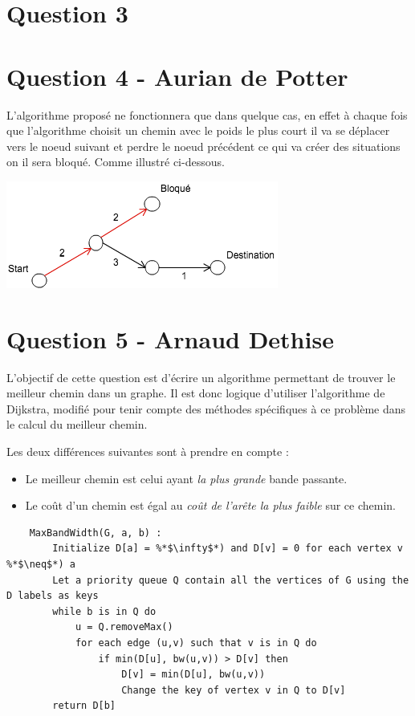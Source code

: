 \documentclass[10pt,a4paper]{article}
\begin{document}
\section*{Question 3}
\section*{Question 4 - Aurian de Potter}
L'algorithme proposé ne fonctionnera que dans quelque cas, en effet à chaque fois que l'algorithme choisit un chemin avec le poids le plus court il va se déplacer vers le noeud suivant et perdre le noeud précédent ce qui va créer des situations on il sera bloqué. Comme illustré ci-dessous.

\begin{center}
    \includegraphics[scale=0.7]{ex.png}
\end{center}

\section*{Question 5 - Arnaud Dethise}

	L'objectif de cette question est d'écrire un algorithme permettant de trouver le meilleur chemin dans un graphe. 
	Il est donc logique d'utiliser l'algorithme de Dijkstra, modifié pour tenir compte des méthodes spécifiques à ce problème dans le calcul du meilleur chemin.
	
	Les deux différences suivantes sont à prendre en compte :
	\begin{itemize}
	\item Le meilleur chemin est celui ayant \textit{la plus grande} bande passante.
	\item Le coût d'un chemin est égal au \textit{coût de l'arête la plus faible} sur ce chemin.
	\end{itemize}
	
	\begin{lstlisting}
	MaxBandWidth(G, a, b) :
		Initialize D[a] = %*$\infty$*) and D[v] = 0 for each vertex v %*$\neq$*) a
		Let a priority queue Q contain all the vertices of G using the D labels as keys
		while b is in Q do
			u = Q.removeMax()
			for each edge (u,v) such that v is in Q do
				if min(D[u], bw(u,v)) > D[v] then
					D[v] = min(D[u], bw(u,v))
					Change the key of vertex v in Q to D[v]
		return D[b]
	\end{lstlisting}
\end{document}
